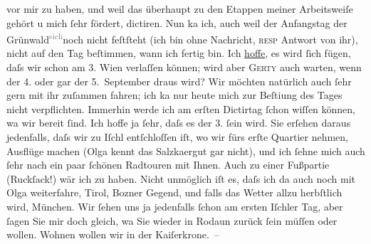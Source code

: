 \begin{ledgroupsized}[t]{13cm}
               vor mir zu haben, und weil das überhaupt zu den Etappen meiner Arbeitsweiſe gehört u
               mich ſehr fördert, dictiren. Nun ka{\geminationn} ich, auch weil der
               Anfangstag der Grünwald\substVorne{}\textsuperscript{\textcolor{gray}{sich}}\substDazwischen{}noch nicht feſtſteht\substHinten{} (ich bin ohne Nachricht, \textsc{resp} Antwort von ihr),
               nicht {\pb}auf den Tag beſtimmen, wann ich fertig bin. Ich
                  \uline{hoffe}, es wird ſich fügen, daſs wir schon am
                  3.{ }Wien verlaſſen können; wird aber \textsc{Gerty} auch warten, wenn der 4. oder gar der 5. September
               draus wird? Wir möchten natürlich auch ſehr gern mit ihr zuſammen fahren; ich ka{\geminationn} nur heute mich zur Beſti{\geminationm}ung des Tages nicht verpflichten. Immerhin werde ich am erſten Dictirtag ſchon
               wiſſen können, wa{\geminationn} wir bereit ſind. Ich hoffe ja ſehr,
               daſs es der 3.{ }ſein wird. Sie erſehen daraus {\pb}jedenfalls, daſs wir zu Iſchl entſchloſſen iſt, wo wir fürs erſte Quartier nehmen, Ausflüge machen
                  (Olga kennt das Salzka{\geminationm}ergut gar nicht), und ich ſehne mich
               auch ſehr nach ein paar ſchönen Radtouren mit Ihnen. Auch zu einer Fußpartie
               (Ruckſack!) wär ich zu haben. Nicht unmöglich iſt es, daſs ich da{\geminationn} auch noch mit Olga
               weiterfahre, Tirol, Bozner Gegend, und falls das Wetter allzu herbſtlich wird, München. Wir ſehen uns ja jedenfalls ſchon am ersten {\pb}Iſchler Tag, aber ſagen Sie mir doch gleich, wa{\geminationn}{ }Sie wieder in Rodaun zurück ſein müſſen oder wollen. Wohnen wollen wir in der Kaiſerkrone. –\pend

\end{ledgroupsized}
